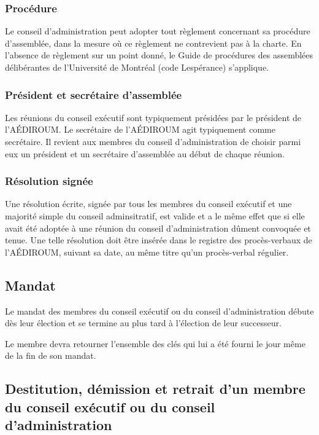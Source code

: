 \documentclass{aediroum}
\begin{document}
\subsubsection{Procédure}\label{sec:procedure-admin}

Le conseil d'administration peut adopter tout règlement concernant sa procédure d'assemblée, dans la mesure où ce règlement ne contrevient pas à la charte. En l'absence de règlement sur un point donné, le Guide de procédures des assemblées délibérantes de l'Université de Montréal (code Lespérance) s'applique.

\subsubsection{Président et secrétaire d'assemblée}\label{sec:president-et-secretaire-dassemblee}

Les réunions du conseil exécutif sont typiquement présidées par le président de l'AÉDIROUM. Le secrétaire de l'AÉDIROUM agit typiquement comme secrétaire. Il revient aux membres du conseil d'administration de choisir parmi eux un président et un secrétaire d'assemblée au début de chaque réunion.

\subsubsection{Résolution signée}\label{sec:resolution-signee}

Une résolution écrite, signée par tous les membres du conseil exécutif et une majorité simple du conseil adminsitratif, est valide et a le même effet que si elle avait été adoptée à une réunion du conseil d'administration dûment convoquée et tenue. Une telle résolution doit être insérée dans le registre des procès-verbaux de l'AÉDIROUM, suivant sa date, au même titre qu'un procès-verbal régulier.

\subsection{Mandat}\label{sec:mandat}
Le mandat des membres du conseil exécutif ou du conseil d'administration débute dès leur élection et se termine au plus tard à l'élection de leur successeur.

Le membre devra retourner l'ensemble des clés qui lui a été fourni le jour même de la fin de son mandat.

\subsection{Destitution, démission et retrait d'un membre du conseil exécutif ou du conseil d'administration}\label{sec:destitution-demission-retrait-exec-admin}
\end{document}
